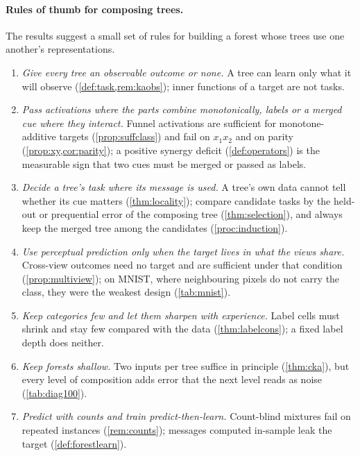 \documentclass[11pt]{article}
\theoremstyle{definition}
\theoremstyle{remark}
\begin{document}
\paragraph{Rules of thumb for composing trees.}
The results suggest a small set of rules for building a forest whose trees use one
another's representations.
\begin{enumerate}[leftmargin=*,noitemsep]
\item \emph{Give every tree an observable outcome or none.}  A tree can learn only what
  it will observe (\cref{def:task,rem:kaobs}); inner functions of a target are not tasks.
\item \emph{Pass activations where the parts combine monotonically, labels or a merged
  cue where they interact.}  Funnel activations are sufficient for monotone-additive
  targets (\cref{prop:suffclass}) and fail on $x_1x_2$ and on parity
  (\cref{prop:xy,cor:parity}); a positive synergy deficit (\cref{def:operators}) is the
  measurable sign that two cues must be merged or passed as labels.
\item \emph{Decide a tree's task where its message is used.}  A tree's own data cannot
  tell whether its cue matters (\cref{thm:locality}); compare candidate tasks by the
  held-out or prequential error of the composing tree (\cref{thm:selection}), and always
  keep the merged tree among the candidates (\cref{proc:induction}).
\item \emph{Use perceptual prediction only when the target lives in what the views
  share.}  Cross-view outcomes need no target and are sufficient under that condition
  (\cref{prop:multiview}); on MNIST, where neighbouring pixels do not carry the class, they
  were the weakest design (\cref{tab:mnist}).
\item \emph{Keep categories few and let them sharpen with experience.}  Label cells must
  shrink and stay few compared with the data (\cref{thm:labelcons}); a fixed label depth
  does neither.
\item \emph{Keep forests shallow.}  Two inputs per tree suffice in principle
  (\cref{thm:cka}), but every level of composition adds error that the next level reads
  as noise (\cref{tab:diag100}).
\item \emph{Predict with counts and train predict-then-learn.}  Count-blind mixtures fail
  on repeated instances (\cref{rem:counts}); messages computed in-sample leak the target
  (\cref{def:forestlearn}).
\end{enumerate}
\end{document}
